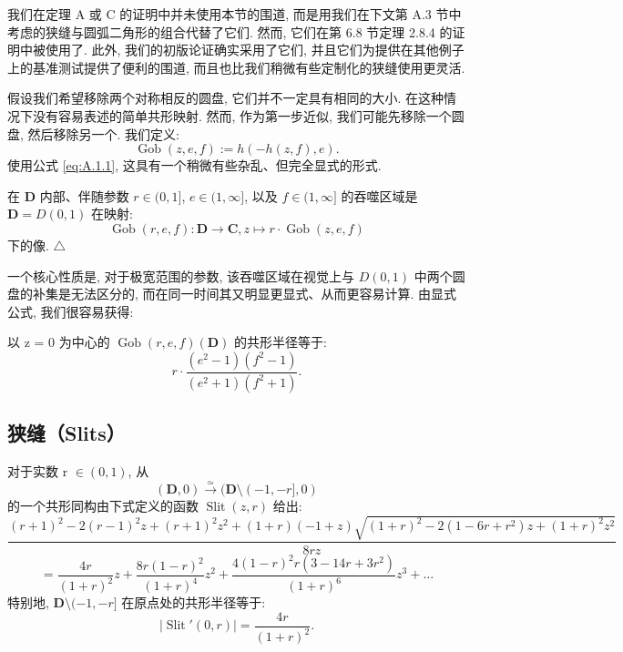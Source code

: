 我们在定理 A 或 C 的证明中并未使用本节的围道, 
而是用我们在下文第 A.3 节中考虑的狭缝与圆弧二角形的组合代替了它们. 
然而, 它们在第 6.8 节定理 2.8.4 的证明中被使用了. 
此外, 我们的初版论证确实采用了它们, 
并且它们为提供在其他例子上的基准测试提供了便利的围道, 
而且也比我们稍微有些定制化的狭缝使用更灵活.

假设我们希望移除两个对称相反的圆盘, 它们并不一定具有相同的大小. 
在这种情况下没有容易表述的简单共形映射. 
然而, 作为第一步近似, 我们可能先移除一个圆盘, 
然后移除另一个. 我们定义:
\[ \operatorname{Gob}(z, e, f) := h(-h(z, f), e). \]
使用公式 \eqref{eq:A.1.1}, 这具有一个稍微有些杂乱、但完全显式的形式.

\begin{definition}\label{def:A.2.1}
在 \(\mathbf{D}\) 内部、伴随参数 \(r \in (0, 1]\), \(e \in (1, \infty]\), 以及 \(f \in (1, \infty]\) 
的吞噬区域是 \(\mathbf{D} = D(0, 1)\) 在映射:
\[ \operatorname{Gob}(r, e, f) : \mathbf{D} \to \mathbf{C}, z \mapsto r \cdot \operatorname{Gob}(z, e, f) \]
下的像. \(\triangle\)
\end{definition}

一个核心性质是, 对于极宽范围的参数, 
该吞噬区域在视觉上与 \(D(0,1)\) 中两个圆盘的补集是无法区分的, 
而在同一时间其又明显更显式、从而更容易计算. 
由显式公式, 我们很容易获得:

\begin{lemma}\label{lem:A.2.2}
以 z = 0 为中心的 \(\operatorname{Gob}(r, e, f)(\mathbf{D})\) 的共形半径等于:
\[ r \cdot \frac{(e^2-1)(f^2-1)}{(e^2+1)(f^2+1)}. \]
\end{lemma}

\subsection{狭缝（Slits）}\label{sec:A.3}

对于实数 r \(\in (0, 1)\), 从
\[ (\mathbf{D},0) \xrightarrow{\simeq} (\mathbf{D} \setminus (-1,-r],0) \]
的一个共形同构由下式定义的函数 \(\operatorname{Slit}(z, r)\) 给出:
\begin{equation}\label{eq:A.3.1}
\frac{(r+1)^2 - 2(r-1)^2 z + (r+1)^2 z^2 + (1+r)(-1+z)\sqrt{(1+r)^2 - 2(1-6r+r^2)z + (1+r)^2 z^2}}{8rz}
\end{equation}
\[ = \frac{4r}{(1+r)^2} z + \frac{8r(1-r)^2}{(1+r)^4} z^2 + \frac{4(1-r)^2 r(3-14r+3r^2)}{(1+r)^6} z^3 + \dots \]
特别地, \(\mathbf{D} \setminus (-1, -r]\) 在原点处的共形半径等于:
\begin{equation}\label{eq:A.3.2}
|\operatorname{Slit}'(0,r)| = \frac{4r}{(1+r)^2}.
\end{equation}

